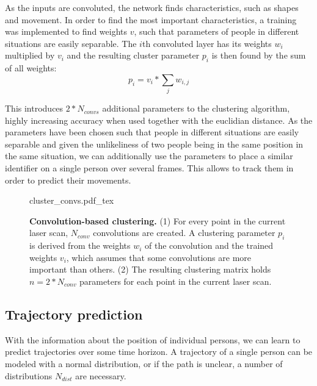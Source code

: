As the inputs are convoluted, the network finds characteristics, such as shapes and movement. In order to find the most important characteristics, a training was implemented to find weights $v$, such that parameters of people in different situations are easily separable. The $i$th convoluted layer has its weights $w_i$ multiplied by $v_i$ and the resulting cluster parameter $p_i$ is then found by the sum of all weights:
\begin{equation}
	p_i = v_{i} * \sum_{j} w_{i,j}
\end{equation}

This introduces $2*N_{convs}$ additional parameters to the clustering algorithm, highly increasing accuracy when used together with the euclidian distance. As the parameters have been chosen such that people in different situations are easily separable and given the unlikeliness of two people being in the same position in the same situation, we can additionally use the parameters to place a similar identifier on a single person over several frames. This allows to track them in order to predict their movements.

\begin{figure}
\def\svgwidth{0.4 \textwidth}
\small
{cluster_convs.pdf_tex}
\caption{\textbf{Convolution-based clustering.} (1) For every point in the current laser scan, $N_{conv}$ convolutions are created. A clustering parameter $p_i$ is derived from the weights $w_i$ of the convolution and the trained weights $v_i$, which assumes that some convolutions are more important than others. (2) The resulting clustering matrix holds $n=2*N_{conv}$ parameters for each point in the current laser scan.}
\label{fig:cluster_convs}
\end{figure}




\subsection{Trajectory prediction}

With the information about the position of individual persons, we can learn to predict trajectories over some time horizon. A trajectory of a single person can be modeled with a normal distribution, or if the path is unclear, a number of distributions $N_{dist}$ are necessary.

